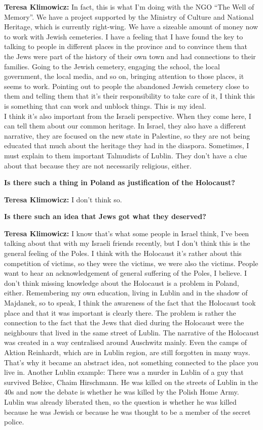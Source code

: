 \textbf{Teresa Klimowicz:} In fact, this is what I'm doing with the NGO ``The Well of Memory''. We have a project supported by the Ministry of Culture and National Heritage, which is currently right-wing. We have a sizeable amount of money now to work with Jewish cemeteries. I have a feeling that I have found the key to talking to people in different places in the province and to convince them that the Jews were part of the history of their own town and had connections to their families. Going to the Jewish cemetery, engaging the school, the local government, the local media, and so on, bringing attention to those places, it seems to work. Pointing out to people the abandoned Jewish cemetery close to them and telling them that it's their responsibility to take care of it, I think this is something that can work and unblock things. This is my ideal.\\ 
I think it's also important from the Israeli perspective. When they come here, I can tell them about our common heritage. In Israel, they also have a different narrative, they are focused on the new state in Palestine, so they are not being educated that much about the heritage they had in the diaspora. Sometimes, I must explain to them important Talmudists of Lublin. They don't have a clue about that because they are not necessarily religious, either. 

\textbf{Is there such a thing in Poland as justification of the Holocaust?}  

\textbf{Teresa Klimowicz:} I don't think so.  

\textbf{Is there such an idea that Jews got what they deserved?}

\textbf{Teresa Klimowicz:} I know that's what some people in Israel think, I've been talking about that with my Israeli friends recently, but I don't think this is the general feeling of the Poles. I think with the Holocaust it’s rather about this competition of victims, so they were the victims, we were also the victims. People want to hear an acknowledgement of general suffering of the Poles, I believe. I don't think missing knowledge about the Holocaust is a problem in Poland, either. Remembering my own education, living in Lublin and in the shadow of Majdanek, so to speak, I think the awareness of the fact that the Holocaust took place and that it was important is clearly there. The problem is rather the connection to the fact that the Jews that died during the Holocaust were the neighbours that lived in the same street of Lublin. The narrative of the Holocaust was created in a way centralised around Auschwitz mainly. Even the camps of Aktion Reinhardt, which are in Lublin region, are still forgotten in many ways. That's why it became an abstract idea, not something connected to the place you live in. Another Lublin example: There was a murder in Lublin of a guy that survived Bełżec, Chaim Hirschmann. He was killed on the streets of Lublin in the 40s and now the debate is whether he was killed by the Polish Home Army. Lublin was already liberated then, so the question is whether he was killed because he was Jewish or because he was thought to be a member of the secret police.  


